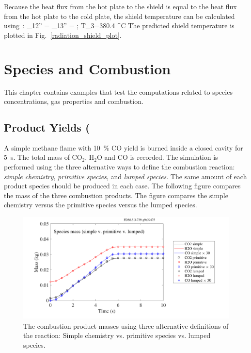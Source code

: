 \documentclass[11pt]{book}
\begin{document}
Because the heat flux from the hot plate to the shield is equal to the heat flux from the hot plate to the cold plate,
the shield temperature can be calculated using~\cite{Incropera:1}:
\be
   \dq_{12}'' = \dq_{13}'' =  \quad ; \quad T_3=380.4 \; ^\circ\hbox{C}
\ee
The predicted shield temperature is plotted in Fig.~\ref{radiation_shield_plot}.




\chapter{Species and Combustion}

This chapter contains examples that test the computations related to species concentrations, gas properties and combustion.



\section{Product Yields (\texorpdfstring{})}

A simple methane flame with 10~\% CO yield is burned inside a closed cavity for 5~s.
The total mass of CO$_2$, H$_2$O and CO is recorded.
The simulation is performed using the three alternative ways
to define the combustion reaction: {\em simple chemistry}, {\em primitive species}, and {\em lumped species}. The
same amount of each product species should be produced in each case. The following figure compares the
mass of the three combustion products. The figure compares the simple chemistry versus the primitive species versus the lumped species.
\begin{figure}[ht]
\begin{center}
\includegraphics[height=2.2in]{SCRIPT_FIGURES/methane_flame_reac_comp}
\caption[Yield of combustion products for alternative reactions]{The combustion product masses using three alternative definitions of the reaction:  Simple chemistry vs. primitive species vs. lumped species. }
\label{fig_methane_flame_yields}
\end{center}
\end{figure}
\end{document}
